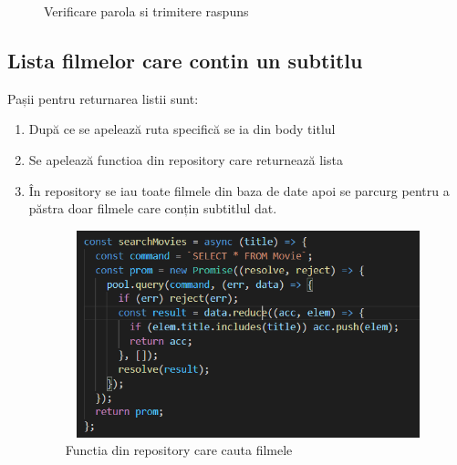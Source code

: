 \begin{enumerate}
\begin{figure}[htbp]
		\caption{Verificare parola si trimitere raspuns}
	
		\label{fig}

	\end{figure}

\end{enumerate}


\subsection{Lista filmelor care contin un subtitlu}
\par Pașii pentru returnarea listii sunt:
\begin{enumerate}
  	\item După ce se apelează ruta specifică se ia din body titlul
  	\item Se apelează functioa din repository care returnează lista
  	\item În repository se iau toate filmele din baza de date apoi se parcurg pentru a păstra doar filmele care conțin subtitlul dat.
		\begin{figure}[htbp]
			\centerline{\includegraphics[width=19cm, height=6cm]{figures/cautarea filme.png}}
			\caption{Functia din repository care cauta filmele}
			\label{fig}
		\end{figure}	
\end{enumerate}

